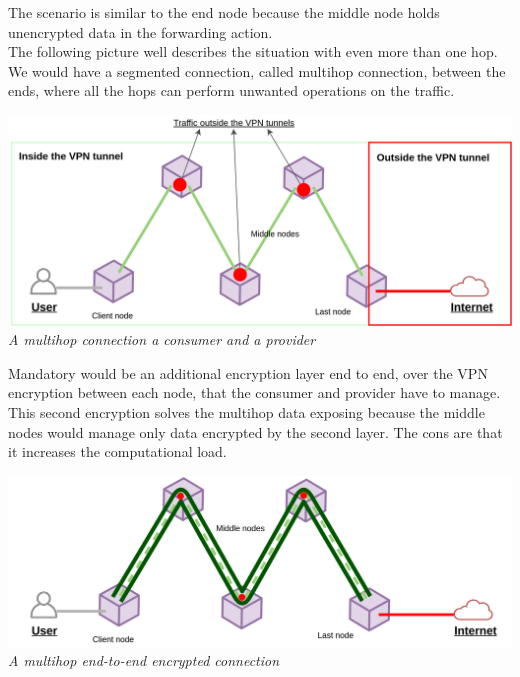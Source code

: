 \documentclass[12pt]{article}
\begin{document}
	The scenario is similar to the end node because the middle node holds unencrypted data in the forwarding action.\\
	The following picture well describes the situation with even more than one hop. We would have a segmented connection, called multihop connection, between the ends, where all the hops can perform unwanted operations on the traffic.\\
	
	\bigbreak
	\begin{center}
		\includegraphics[width=1\linewidth]{images/client_server_vpn_multihop_connection.png}\\
		\small{\textit{A multihop connection a consumer and a provider}}
	\end{center}
	\bigbreak

	Mandatory would be an additional encryption layer end to end, over the VPN encryption between each node, that the consumer and provider have to manage. This second encryption solves the multihop data exposing because the middle nodes would manage only data encrypted by the second layer. The cons are that it increases the computational load.\\

	\bigbreak
	\begin{center}
		\includegraphics[width=1\linewidth]{images/client_server_vpn_multihop_connection_e2e_enc.png}\\
		\small{\textit{A multihop end-to-end encrypted connection}}
	\end{center}
	\bigbreak	
\end{document}

